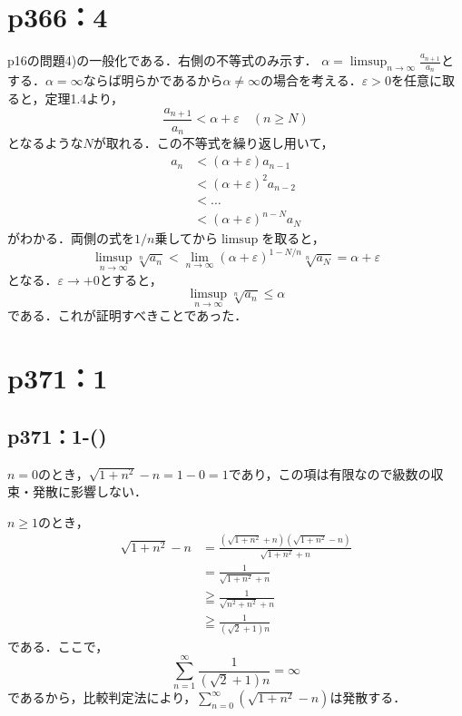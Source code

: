 \section*{p366：4}

\begin{tproof}
    p16の問題4)の一般化である．右側の不等式のみ示す．
    $\alpha = \limsup _{n \to \infty} \frac{a_{n+1}}{a_{n}}$とする．$\alpha = \infty$ならば明らかであるから$\alpha \neq \infty$の場合を考える．$\varepsilon > 0$を任意に取ると，定理1.4より，
    \[
        \frac{a_{n+1}}{a_{n}} < \alpha + \varepsilon \quad (n \geq N)
    \]
    となるような$N$が取れる．この不等式を繰り返し用いて，
    \begin{align*}
        a_n
         & < (\alpha + \varepsilon) a_{n-1}   \\
         & < (\alpha + \varepsilon)^2 a_{n-2} \\
         & < \ldots                           \\
         & < (\alpha + \varepsilon)^{n-N} a_N
    \end{align*}
    がわかる．両側の式を$1/n$乗してから$\limsup$を取ると，
    \[
        \limsup _{n \to \infty} \sqrt[n]{a_n} < \lim _{n \to \infty} (\alpha + \varepsilon)^{1-N/n} \sqrt[n]{a_N} = \alpha + \varepsilon
    \]
    となる．$\varepsilon \to +0$とすると，
    \[
        \limsup _{n \to \infty} \sqrt[n]{a_n} \leq \alpha
    \]
    である．これが証明すべきことであった．
\end{tproof}


\section*{p371：1}


\subsection*{p371：1-()}

\begin{tanswer}
    $n =0$のとき，$\sqrt{1+n^2}-n =1-0= 1$であり，この項は有限なので級数の収束・発散に影響しない．

    $n \geq 1$のとき，
    \begin{align*}
        \sqrt{1+n^2}-n & = \frac{(\sqrt{1+n^2}+n)(\sqrt{1+n^2}-n)}{\sqrt{1+n^2}+n} \\
                       & = \frac{1}{\sqrt{1+n^2}+n}                                \\
                       & \geqq \frac{1}{\sqrt{n^2+n^2}+n}                          \\
                       & \geqq \frac{1}{(\sqrt{2}+1)n}
    \end{align*}
    である．ここで，
    \[
        \sum_{n=1}^{\infty} \frac{1}{(\sqrt{2}+1)n} =\infty
    \]
    であるから，比較判定法により，$ \sum_{n=0}^{\infty} ( \sqrt{1+n^2}-n )$は発散する．
\end{tanswer}


